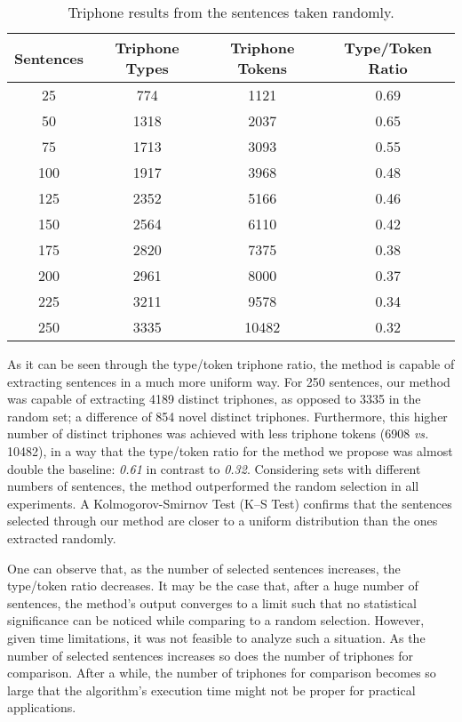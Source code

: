 \begin{table}[!ht]
\begin{center}
\begin{tabular}{|c|c|c|c|}
\hline
Sentences & Triphone Types & Triphone Tokens & Type/Token Ratio \\ \hline
25 & 774 & 1121 & 0.69 \\
50 & 1318 & 2037 & 0.65 \\ 
75 & 1713 & 3093 & 0.55 \\ 
100 & 1917 & 3968 & 0.48 \\ 
125 & 2352 & 5166 & 0.46 \\ 
150 & 2564 & 6110 & 0.42 \\ 
175 & 2820 & 7375 & 0.38 \\ 
200 & 2961 & 8000 & 0.37 \\ 
225 & 3211 & 9578 & 0.34 \\ 
250 & 3335 & 10482 & 0.32 \\ \hline
\end{tabular}
\end{center}
\caption{\label{results-tri-random} Triphone results from the sentences taken randomly.}
\end{table}

As it can be seen through the type/token triphone ratio, the method is capable of extracting sentences in a much more uniform way. 
For 250 sentences, our method was capable of extracting 4189 distinct triphones, as opposed to 3335 in the random set; a difference of 854 
novel distinct triphones. Furthermore, this higher number of distinct triphones was achieved with less triphone tokens (6908 \emph{vs.} 10482), in a way that the type/token 
ratio for the method we propose was almost double the baseline: \emph{0.61} in contrast to \emph{0.32}. Considering sets with different 
numbers of sentences, the method outperformed the random selection in all experiments. A Kolmogorov-Smirnov Test 
(K--S Test) confirms that the sentences selected through our method are closer to a uniform distribution than the ones extracted randomly.

One can observe that, as the number of selected sentences increases, the type/token ratio decreases. It may be the case that, 
after a huge number of sentences, the method's output converges to a limit such that no statistical significance can be noticed 
while comparing to a random selection. However, given time limitations, it was not feasible to analyze such a situation.
As the number of selected sentences increases so does the number of triphones for comparison. After a while,
the number of triphones for comparison becomes so large that the algorithm's execution time might not be proper for 
practical applications.

